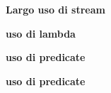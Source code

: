 \textbf{Largo uso di stream}\newline

\textbf{uso di lambda}\newline

\textbf{uso di predicate}\newline

\textbf{uso di predicate}\newline